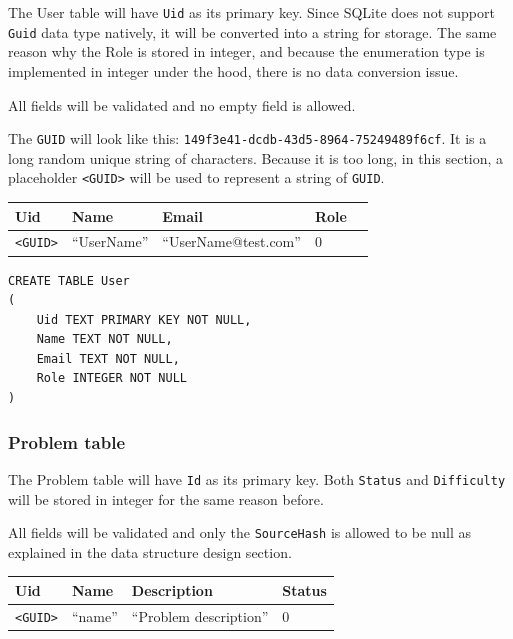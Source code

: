 \documentclass[a4paper]{report}
\begin{document}
The User table will have \texttt{Uid} as its primary key. Since SQLite does not support \texttt{Guid} data type natively, it will be converted into a string for storage. The same reason why the Role is stored in integer, and because the enumeration type is implemented in integer under the hood, there is no data conversion issue.

All fields will be validated and no empty field is allowed.

The \texttt{GUID} will look like this: \texttt{149f3e41-dcdb-43d5-8964-75249489f6cf}. It is a long random unique string of characters. Because it is too long, in this section, a placeholder \texttt{<GUID>} will be used to represent a string of \texttt{GUID}.

\begin{tabulary}{\textwidth}{|L|L|L|L|L|}
    \hline
    Uid & Name & Email & Role \\
    \hline
    \texttt{<GUID>} & ``UserName'' & ``UserName@test.com'' & 0 \\
    \hline
\end{tabulary}

\begin{verbatim}
CREATE TABLE User
(
    Uid TEXT PRIMARY KEY NOT NULL,
    Name TEXT NOT NULL,
    Email TEXT NOT NULL,
    Role INTEGER NOT NULL
)
\end{verbatim}

\subsubsection{Problem table}

The Problem table will have \texttt{Id} as its primary key. Both \texttt{Status} and \texttt{Difficulty} will be stored in integer for the same reason before.

All fields will be validated and only the \texttt{SourceHash} is allowed to be null as explained in the data structure design section.

\begin{tabulary}{\textwidth}{|L|L|L|L|}
    \hline
    Uid & Name & Description & Status  \\
    \hline
    \texttt{<GUID>} & ``name'' & ``Problem description'' & 0 \\
    \hline
\end{tabulary}
\end{document}
